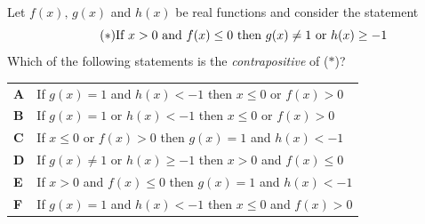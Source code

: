 \documentclass[11pt,a4paper]{article}
\begin{document}
\begin{enumerate}[label=\textbf{\arabic*.},leftmargin=*,itemsep=0pt,start=2]
\questionitem[Logic]
Let $f(x),\, g(x)$ and $h(x)$ be real functions and consider the statement \begin{equation}\tag{$\ast$} \text{If $x>0$ and $f(x)\le 0$ then $g(x)\neq 1$ or $h(x)\ge -1$}\\[5pt] \end{equation} Which of the following statements is the \textit{contrapositive} of ($\ast$)?

\par\vspace*{12pt}
\begin{tabularx}{\linewidth}{@{}>{\bfseries}l Y@{}}
A &
If $g(x) = 1$ and $h(x) < -1$ then $x \le 0$ or $f(x) > 0$
\\[0.8em]
B &
If $g(x) = 1$ or $h(x) < -1$ then $x \le 0$ or $f(x) > 0$
\\[0.8em]
C &
If $x \le 0$ or $f(x) > 0$ then $g(x) = 1$ and $h(x) < -1$
\\[0.8em]
D &
If $g(x) \neq 1$ or $h(x) \ge -1$ then $x > 0$ and $f(x) \le 0$
\\[0.8em]
E &
If $x > 0$ and $f(x) \le 0$ then $g(x) = 1$ and $h(x) < -1$
\\[0.8em]
F &
If $g(x) = 1$ and $h(x) < -1$ then $x \le 0$ and $f(x) > 0$
\\
\end{tabularx}
\end{enumerate}
\clearpage
\thispagestyle{djspaper}
\vspace*{8pt}
\end{document}
